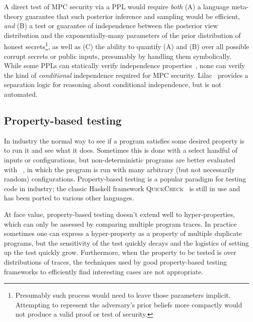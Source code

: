 \documentclass[compsoc, conference, a4paper, 10pt, times]{IEEEtran}
\begin{document}
A direct test of MPC security via a PPL would require \emph{both}
(A) a language meta-theory guarantee that such posterior inference and sampling would be efficient, \emph{and}
(B) a test or guarantee of independence between the posterior view distribution and the exponentially-many parameters
of the prior distribution of honest secrets\footnote{
    Presumably such process would need to leave those parameters implicit.
    Attempting to represent the adversary's prior beliefs more compactly would not produce a valid proof or test of security.
}, as well as
(C) the ability to quantify (A) and (B) over all possible corrupt secrets or public inputs, presumably by handling them symbolically.
While some PPLs can statically verify independence properties~\cite{gorinova2021conditional}, none can verify the kind of \emph{conditional} independence required for MPC security. Lilac~\cite{li2023lilac} provides a separation logic for reasoning about conditional independence, but is not automated.

\subsection{Property-based testing}

In industry the normal way to see if a program satisfies some desired property is to run it and see what it does.
Sometimes this is done with a select handful of inputs or configurations,
but non-deterministic programs are better evaluated with ~\cite{fink1997property, claessen2000quickcheck, paraskevopoulou2015foundational},
in which the program is run with many arbitrary (but not necessarily random) configurations.
Property-based testing is a popular paradigm for testing code in industry;
the classic Haskell framework \textsc{QuickCheck}~\cite{claessen2000quickcheck}
is still in use and has been ported to various other languages.

At face value, property-based testing doesn't extend well to hyper-properties,
which can only be assessed by comparing multiple program traces.
In practice sometimes one can express a hyper-property as a property of multiple duplicate programs,
but the sensitivity of the test quickly decays and the logistics of setting up the test quickly grow.
Furthermore, when the property to be tested is over distributions of traces,
the techniques used by good property-based testing frameworks to efficiently find interesting cases are not appropriate.
\end{document}
